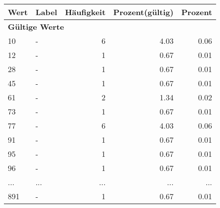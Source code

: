      \begin{longtable}{lXrrr}
     \toprule
     \textbf{Wert} & \textbf{Label} & \textbf{Häufigkeit} & \textbf{Prozent(gültig)} & \textbf{Prozent} \\
     \endhead
     \midrule
     \multicolumn{5}{l}{\textbf{Gültige Werte}}\\
        10 & \multicolumn{1}{X}{-} & %
          \num{6} &
          \num[round-mode=places,round-precision=2]{4,03} &
          \num[round-mode=places,round-precision=2]{0,06} \\
        12 & \multicolumn{1}{X}{-} & %
          \num{1} &
          \num[round-mode=places,round-precision=2]{0,67} &
          \num[round-mode=places,round-precision=2]{0,01} \\
        28 & \multicolumn{1}{X}{-} & %
          \num{1} &
          \num[round-mode=places,round-precision=2]{0,67} &
          \num[round-mode=places,round-precision=2]{0,01} \\
        45 & \multicolumn{1}{X}{-} & %
          \num{1} &
          \num[round-mode=places,round-precision=2]{0,67} &
          \num[round-mode=places,round-precision=2]{0,01} \\
        61 & \multicolumn{1}{X}{-} & %
          \num{2} &
          \num[round-mode=places,round-precision=2]{1,34} &
          \num[round-mode=places,round-precision=2]{0,02} \\
        73 & \multicolumn{1}{X}{-} & %
          \num{1} &
          \num[round-mode=places,round-precision=2]{0,67} &
          \num[round-mode=places,round-precision=2]{0,01} \\
        77 & \multicolumn{1}{X}{-} & %
          \num{6} &
          \num[round-mode=places,round-precision=2]{4,03} &
          \num[round-mode=places,round-precision=2]{0,06} \\
        91 & \multicolumn{1}{X}{-} & %
          \num{1} &
          \num[round-mode=places,round-precision=2]{0,67} &
          \num[round-mode=places,round-precision=2]{0,01} \\
        95 & \multicolumn{1}{X}{-} & %
          \num{1} &
          \num[round-mode=places,round-precision=2]{0,67} &
          \num[round-mode=places,round-precision=2]{0,01} \\
        96 & \multicolumn{1}{X}{-} & %
          \num{1} &
          \num[round-mode=places,round-precision=2]{0,67} &
          \num[round-mode=places,round-precision=2]{0,01} \\
       ... & ... & ... & ... & ... \\
        891 & \multicolumn{1}{X}{-} & %
          \num{1} &
          \num[round-mode=places,round-precision=2]{0,67} &
          \num[round-mode=places,round-precision=2]{0,01} \\


\end{longtable}
